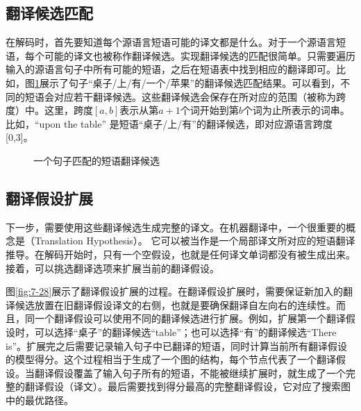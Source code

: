 \subsection{翻译候选匹配}

\parinterval 在解码时，首先要知道每个源语言短语可能的译文都是什么。对于一个源语言短语，每个可能的译文也被称作翻译候选。实现翻译候选的匹配很简单。只需要遍历输入的源语言句子中所有可能的短语，之后在短语表中找到相应的翻译即可。比如，图\ref{fig:7-27}展示了句子“桌子/上/有/一个/苹果”的翻译候选匹配结果。可以看到，不同的短语会对应若干翻译候选。这些翻译候选会保存在所对应的范围（被称为跨度）中。这里，跨度$[a,b]$表示从第$a+1$个词开始到第$b$个词为止所表示的词串。比如，“upon the table” 是短语“桌子/上/有”的翻译候选，即对应源语言跨度[0,3]。

\begin{figure}[htp]
\centering

\caption{一个句子匹配的短语翻译候选}
\label{fig:7-27}
\end{figure}


\subsection{翻译假设扩展}

\parinterval 下一步，需要使用这些翻译候选生成完整的译文。在机器翻译中，一个很重要的概念是{\small{}}（Translation Hypothesis）。 它可以被当作是一个局部译文所对应的短语翻译推导。在解码开始时，只有一个空假设，也就是任何译文单词都没有被生成出来。接着，可以挑选翻译选项来扩展当前的翻译假设。

\parinterval 图\ref{fig:7-28}展示了翻译假设扩展的过程。在翻译假设扩展时，需要保证新加入的翻译候选放置在旧翻译假设译文的右侧，也就是要确保翻译自左向右的连续性。而且，同一个翻译假设可以使用不同的翻译候选进行扩展。例如，扩展第一个翻译假设时，可以选择“桌子”的翻译候选“table”；也可以选择“有”的翻译候选“There is”。扩展完之后需要记录输入句子中已翻译的短语，同时计算当前所有翻译假设的模型得分。这个过程相当于生成了一个图的结构，每个节点代表了一个翻译假设。当翻译假设覆盖了输入句子所有的短语，不能被继续扩展时，就生成了一个完整的翻译假设（译文）。最后需要找到得分最高的完整翻译假设，它对应了搜索图中的最优路径。

